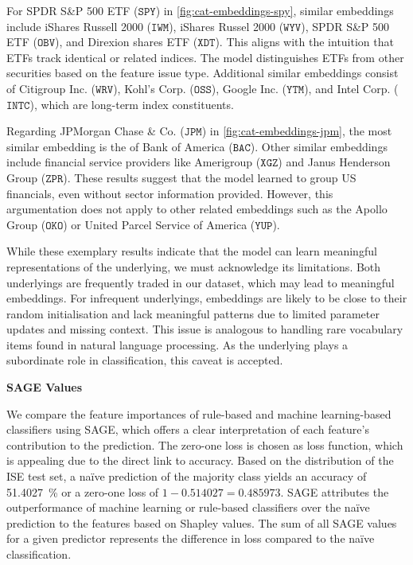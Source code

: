 For SPDR S\&P 500 ETF ($\mathtt{SPY}$) in \cref{fig:cat-embeddings-spy}, similar embeddings include iShares Russell 2000 ($\mathtt{IWM}$), iShares Russel 2000 ($\mathtt{WYV}$), SPDR S\&P 500 ETF ($\mathtt{OBV}$), and Direxion shares ETF ($\mathtt{XDT}$). This aligns with the intuition that \glspl{ETF} track identical or related indices. The model distinguishes \glspl{ETF} from other securities based on the feature issue type. Additional similar embeddings consist of Citigroup Inc. ($\mathtt{WRV}$), Kohl's Corp. ($\mathtt{OSS}$), Google Inc. ($\mathtt{YTM}$), and Intel Corp. ($\mathtt{INTC}$), which are long-term index constituents.

Regarding JPMorgan Chase \& Co. ($\mathtt{JPM}$) in \cref{fig:cat-embeddings-jpm}, the most similar embedding is the of Bank of America ($\mathtt{BAC}$). Other similar embeddings include financial service providers like Amerigroup ($\mathtt{XGZ}$) and Janus Henderson Group ($\mathtt{ZPR}$). These results suggest that the model learned to group US financials, even without sector information provided. However, this argumentation does not apply to other related embeddings such as the Apollo Group ($\mathtt{OKO}$) or United Parcel Service of America ($\mathtt{YUP}$). %

While these exemplary results indicate that the model can learn meaningful representations of the underlying, we must acknowledge its limitations. Both underlyings are frequently traded in our dataset, which may lead to meaningful embeddings. For infrequent underlyings, embeddings are likely to be close to their random initialisation and lack meaningful patterns due to limited parameter updates and missing context. This issue is analogous to handling rare vocabulary items found in natural language processing. As the underlying plays a subordinate role in classification, this caveat is accepted.

\textbf{SAGE Values}

We compare the feature importances of rule-based and machine learning-based classifiers using \gls{SAGE}, which offers a clear interpretation of each feature's contribution to the prediction. The zero-one loss is chosen as loss function, which is appealing due to the direct link to accuracy. Based on the distribution of the \gls{ISE} test set, a na\"ive prediction of the majority class yields an accuracy of \SI{51.4027}{\percent} or a zero-one loss of $1- \num{0.514027} = \num{0.485973}$. \gls{SAGE} attributes the outperformance of machine learning or rule-based classifiers over the na\"ive prediction to the features based on Shapley values. The sum of all \gls{SAGE} values for a given predictor represents the difference in loss compared to the na\"ive classification.

